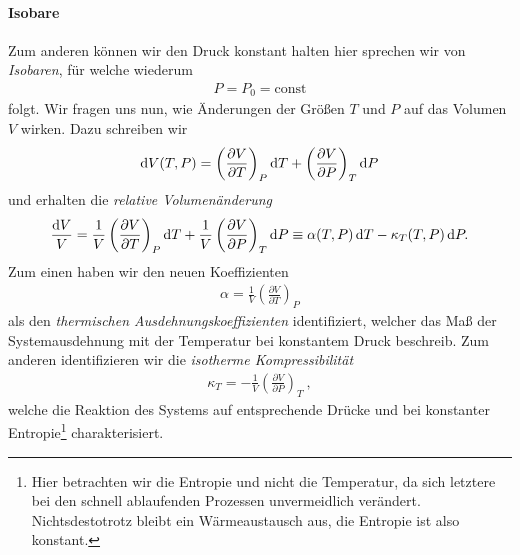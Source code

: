 \paragraph*{Isobare}
Zum anderen können wir den Druck konstant halten \textendash{} hier sprechen wir von \emph{Isobaren}, für welche wiederum
\begin{align*}
    P=P_0=\mathrm{const}%
\end{align*}
folgt.
Wir fragen uns nun, wie Änderungen der Größen $T$ und $P$ auf das Volumen $V$ wirken. Dazu schreiben wir
\begin{align*}
    \mathop{}\!\mathrm{d} V (T,P)= \left( \frac{\partial V}{\partial T}\right)_P \mathop{}\!\mathrm{d} T+\left( \frac{\partial V}{\partial P}\right)_T \mathop{}\!\mathrm{d} P
\end{align*}
und erhalten die \emph{relative Volumenänderung}
\begin{align*}
    \frac{\mathop{}\!\mathrm{d} V}{V}=\frac{1}{V}\left( \frac{\partial V}{\partial T}\right)_P\mathop{}\!\mathrm{d} T+\frac{1}{V}\left( \frac{\partial V}{\partial P}\right)_T\mathop{}\!\mathrm{d} P \equiv \alpha(T,P)\mathop{}\!\mathrm{d} T-\kappa_T(T,P)\mathop{}\!\mathrm{d} P.
\end{align*}
Zum einen haben wir den neuen Koeffizienten
\begin{align*}
    \boxed{\alpha=\frac{1}{V}\left( \frac{\partial V}{\partial T}\right)_P}
\end{align*}
als den \emph{thermischen Ausdehnungskoeffizienten} identifiziert, welcher das Maß der Systemausdehnung mit der Temperatur bei konstantem Druck beschreib. Zum anderen identifizieren wir die \emph{isotherme Kompressibilität}
\begin{align*}
    \boxed{\kappa_T=-\frac{1}{V}\left( \frac{\partial V}{\partial P}\right)_T}\:,
\end{align*}
welche die Reaktion des Systems auf entsprechende Drücke und bei konstanter Entropie\footnote{Hier betrachten wir die Entropie und nicht die Temperatur, da sich letztere bei den schnell ablaufenden Prozessen unvermeidlich verändert. Nichtsdestotrotz bleibt ein Wärmeaustausch aus, die Entropie ist also konstant.} charakterisiert.


